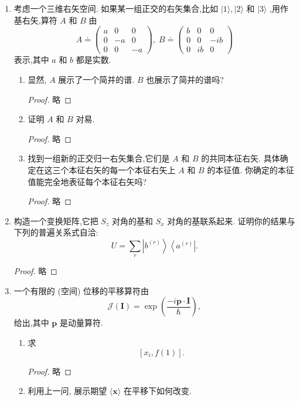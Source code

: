 \begin{enumerate}
	\item 考虑一个三维右矢空间. 如果某一组正交的右矢集合,比如 $\left| {1\rangle ,}\right| 2\rangle$ 和 $|3\rangle$ ,用作基右矢,算符 $A$ 和 $B$ 由
	$$
	A \doteq \left( \begin{matrix} a & 0 & 0 \\ 0 & - a & 0 \\ 0 & 0 & - a \end{matrix}\right) ,\;B \doteq \left( \begin{matrix} b & 0 & 0 \\ 0 & 0 & - {ib} \\ 0 & {ib} & 0 \end{matrix}\right)
	$$
	表示,其中 $a$ 和 $b$ 都是实数.
	\begin{enumerate}
		\item 显然, $A$ 展示了一个简并的谱. $B$ 也展示了简并的谱吗?
		\begin{proof}
			略
		\end{proof}
		\item 证明 $A$ 和 $B$ 对易.
		\begin{proof}
			略
		\end{proof}
		\item 找到一组新的正交归一右矢集合,它们是 $A$ 和 $B$ 的共同本征右矢. 具体确定在这三个本征右矢的每一个本征右矢上 $A$ 和 $B$ 的本征值. 你确定的本征值能完全地表征每个本征右矢吗?
		\begin{proof}
			略
		\end{proof}
	\end{enumerate}
	\item 构造一个变换矩阵,它把 ${S}_{z}$ 对角的基和 ${S}_{x}$ 对角的基联系起来. 证明你的结果与下列的普遍关系式自洽:
	$$
	U = \mathop{\sum }\limits_{r}\left| {b}^{\left( r\right) }\right\rangle \left\langle {a}^{\left( r\right) }\right| .
	$$
	\begin{proof}
		略
	\end{proof}
	\item 一个有限的 (空间) 位移的平移算符由
	$$
	\mathcal{J}\left( \mathbf{I}\right) = \exp \left( \frac{-i\mathbf{p} \cdot \mathbf{I}}{\hbar }\right) ,
	$$
	给出,其中 $\mathbf{p}$ 是动量算符.
	\begin{enumerate}
		\item 求
		$$
		\left\lbrack {{x}_{i}, f\left( 1\right) }\right\rbrack \text{.}
		$$
		\begin{proof}
			略
		\end{proof}
		\item 利用上一问, 展示期望 $\langle \mathbf{x}\rangle$ 在平移下如何改变.

\end{enumerate}
\end{enumerate}
